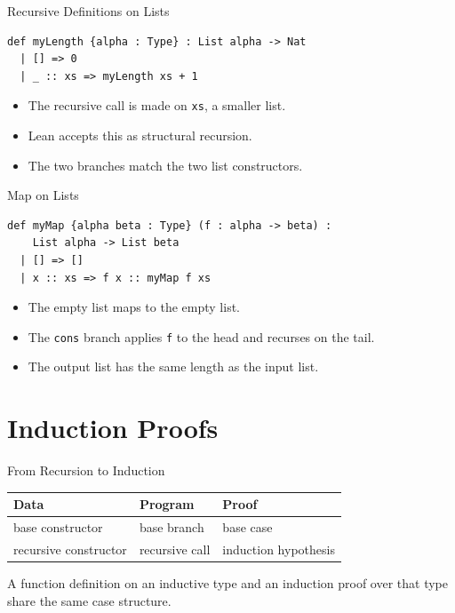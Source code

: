 ﻿\documentclass[aspectratio=169,11pt]{beamer}
\begin{document}
\begin{frame}[fragile]{Recursive Definitions on Lists}
  \begin{lstlisting}
def myLength {alpha : Type} : List alpha -> Nat
  | [] => 0
  | _ :: xs => myLength xs + 1
  \end{lstlisting}

  \begin{itemize}
    \item The recursive call is made on \texttt{xs}, a smaller list.
    \item Lean accepts this as structural recursion.
    \item The two branches match the two list constructors.
  \end{itemize}
\end{frame}

\begin{frame}[fragile]{Map on Lists}
  \begin{lstlisting}
def myMap {alpha beta : Type} (f : alpha -> beta) :
    List alpha -> List beta
  | [] => []
  | x :: xs => f x :: myMap f xs
  \end{lstlisting}

  \begin{itemize}
    \item The empty list maps to the empty list.
    \item The \texttt{cons} branch applies \texttt{f} to the head and recurses on the tail.
    \item The output list has the same length as the input list.
  \end{itemize}
\end{frame}

\section{Induction Proofs}

\begin{frame}{From Recursion to Induction}
  \begin{tabular}{@{}lll@{}}
    \toprule
    Data & Program & Proof \\
    \midrule
    base constructor & base branch & base case \\
    recursive constructor & recursive call & induction hypothesis \\
    \bottomrule
  \end{tabular}

  \vspace{0.8em}

  A function definition on an inductive type and an induction proof over that type share the same case structure.
\end{frame}
\end{document}
